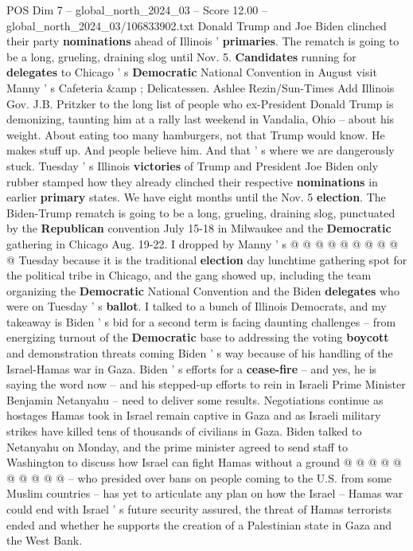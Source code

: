 \begin{textsample}{POS Dim 7 – global\_north\_2024\_03 – Score 12.00 – global\_north\_2024\_03/106833902.txt}  \label{ex:f7_pos_039}
Donald Trump and Joe Biden clinched their party \textbf{nominations} ahead of Illinois ' \textbf{primaries}.
The rematch is going to be a long, grueling, draining slog until Nov. 5. \textbf{Candidates} running for \textbf{delegates} to Chicago ' s \textbf{Democratic} National Convention in August visit Manny ' s Cafeteria \&amp ; Delicatessen.
Ashlee Rezin/Sun-Times Add Illinois Gov.
J.B.
Pritzker to the long list of people who ex-President Donald Trump is demonizing, taunting him at a rally last weekend in Vandalia, Ohio -- about his weight.
About eating too many hamburgers, not that Trump would know.
He makes stuff up.
And people believe him.
And that ' s where we are dangerously stuck.
Tuesday ' s Illinois \textbf{victories} of Trump and President Joe Biden only rubber stamped how they already clinched their respective \textbf{nominations} in earlier \textbf{primary} states.
We have eight months until the Nov. 5 \textbf{election}.
The Biden-Trump rematch is going to be a long, grueling, draining slog, punctuated by the \textbf{Republican} convention July 15-18 in Milwaukee and the \textbf{Democratic} gathering in Chicago Aug. 19-22.
I dropped by Manny ' s @ @ @ @ @ @ @ @ @ @ Tuesday because it is the traditional \textbf{election} day lunchtime gathering spot for the political tribe in Chicago, and the gang showed up, including the team organizing the \textbf{Democratic} National Convention and the Biden \textbf{delegates} who were on Tuesday ' s \textbf{ballot}.
I talked to a bunch of Illinois Democrats, and my takeaway is Biden ' s bid for a second term is facing daunting challenges -- from energizing turnout of the \textbf{Democratic} base to addressing the voting \textbf{boycott} and demonstration threats coming Biden ' s way because of his handling of the Israel-Hamas war in Gaza.
Biden ' s efforts for a \textbf{cease-fire} -- and yes, he is saying the word now -- and his stepped-up efforts to rein in Israeli Prime Minister Benjamin Netanyahu -- need to deliver some results.
Negotiations continue as hostages Hamas took in Israel remain captive in Gaza and as Israeli military strikes have killed tens of thousands of civilians in Gaza.
Biden talked to Netanyahu on Monday, and the prime minister agreed to send staff to Washington to discuss how Israel can fight Hamas without a ground @ @ @ @ @ @ @ @ @ @ -- who presided over bans on people coming to the U.S. from some Muslim countries -- has yet to articulate any plan on how the Israel -- Hamas war could end with Israel ' s future security assured, the threat of Hamas terrorists ended and whether he supports the creation of a Palestinian state in Gaza and the West Bank.

\end{textsample}

